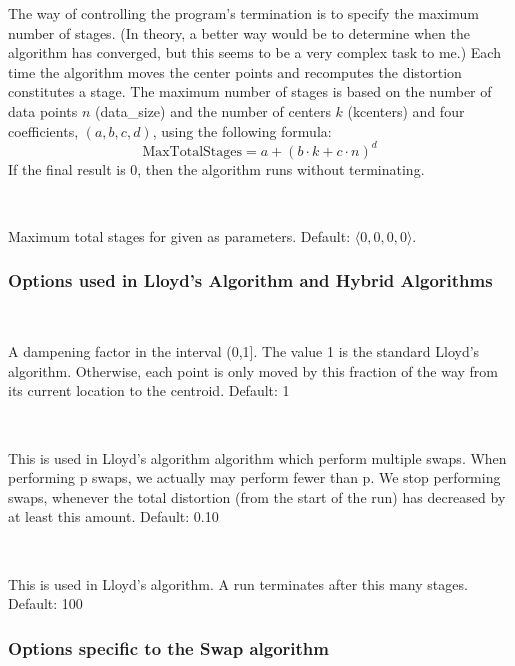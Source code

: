 \documentclass[11pt]{article}		%
\newcommand{\ang}[1]{\langle #1\rangle}
\newenvironment{description*}%
  {\begin{description}%
    \setlength{\itemsep}{-0.5ex}%
    \setlength{\parsep}{0pt}}%
  {\end{description}}
\begin{document}
The way of controlling the program's termination is to specify the
maximum number of stages.  (In theory, a better way would be to
determine when the algorithm has converged, but this seems to be a very
complex task to me.)  Each time the algorithm moves the center points
and recomputes the distortion constitutes a stage.  The maximum number
of stages is based on the number of data points $n$ (data\_size) and the
number of centers $k$ (kcenters) and four coefficients, $(a,b,c,d)$,
using the following formula:
\[
  	\textrm{MaxTotalStages} = a + (b \cdot k + c \cdot n)^d
\]
If the final result is 0, then the algorithm runs without terminating.

\begin{description*}
\item[\SF{max\_tot\_stage \BR{4 $\times$ float}}] ~

	Maximum total stages for given as parameters.
	Default: $\ang{0,0,0,0}$.
\end{description*}

\subsubsection{Options used in Lloyd's Algorithm and Hybrid Algorithms}

\begin{description*}
\item[\SF{damp\_factor \BR{float}}] ~

	A dampening factor in the interval (0,1].  The value 1 is the
	standard Lloyd's algorithm.  Otherwise, each point is only moved
	by this fraction of the way from its current location to the
	centroid.  Default: 1

\item[\SF{min\_accum\_rdl \BR{float}}] ~

	This is used in Lloyd's algorithm algorithm which perform
	multiple swaps.  When performing p swaps, we actually may
	perform fewer than p.  We stop performing swaps, whenever the
	total distortion (from the start of the run) has decreased by at
	least this amount.  Default: 0.10

\item[\SF{max\_run\_stage \BR{int}}] ~

	This is used in Lloyd's algorithm.  A run terminates after this
	many stages.  Default: 100
\end{description*}

\subsubsection{Options specific to the Swap algorithm}
\end{document}

